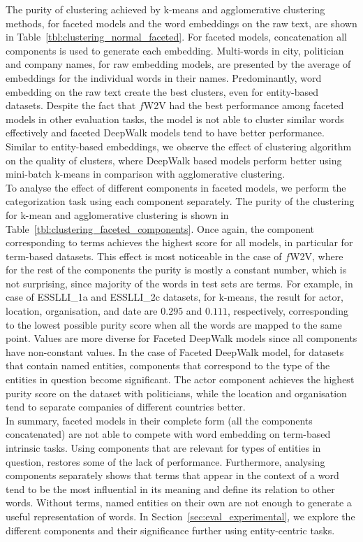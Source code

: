 The purity of clustering achieved by k-means and agglomerative clustering methods, for faceted models and the word embeddings on the raw text, are shown in Table~\ref{tbl:clustering_normal_faceted}. For faceted models, concatenation all components is used to generate each embedding. Multi-words in city, politician and company names, for raw embedding models, are presented by the average of embeddings for the individual words in their names. Predominantly, word embedding on the raw text create the best clusters, even for entity-based datasets. Despite the fact that $f$W2V had the best performance among faceted models in other evaluation tasks, the model is not able to cluster similar words effectively and faceted DeepWalk models tend to have better performance. Similar to entity-based embeddings, we observe the effect of clustering algorithm on the quality of clusters, where DeepWalk based models perform better using mini-batch k-means in comparison with agglomerative clustering.\\
To analyse the effect of different components in faceted models, we perform the categorization task using each component separately. The purity of the clustering for k-mean and agglomerative clustering is shown in Table~\ref{tbl:clustering_faceted_components}. Once again, the component corresponding to terms achieves the highest score for all models, in particular for term-based datasets. This effect is most noticeable in the case of $f$W2V, where for the rest of the components the purity is mostly a constant number, which is not surprising, since majority of the words in test sets are terms. For example, in case of ESSLLI\_1a and ESSLLI\_2c datasets, for k-means, the result for actor, location, organisation, and date are $0.295$ and $0.111$, respectively, corresponding to the lowest possible purity score when all the words are mapped to the same point. Values are more diverse for Faceted DeepWalk models since all components have non-constant values. In the case of Faceted DeepWalk model, for datasets that contain named entities, components that correspond to the type of the entities in question become significant. The actor component achieves the highest purity score on the dataset with politicians, while the location and organisation tend to separate companies of different countries better.\\

In summary, faceted models in their complete form (all the components concatenated) are not able to compete with word embedding on term-based intrinsic tasks. Using components that are relevant for types of entities in question, restores some of the lack of performance. Furthermore, analysing components separately shows that terms that appear in the context of a word tend to be the most influential in its meaning and define its relation to other words. Without terms, named entities on their own are not enough to generate a useful representation of words. In Section~\ref{sec:eval_experimental}, we explore the different components and their significance further using entity-centric tasks. 
